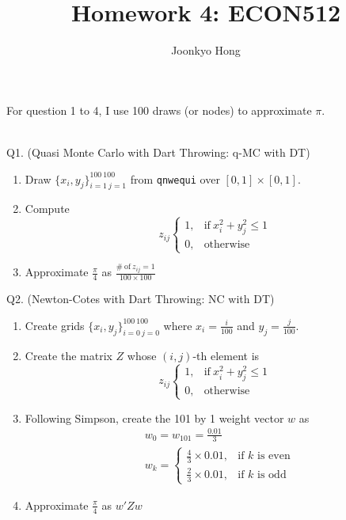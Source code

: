 \documentclass[10pt, letterpaper]{article}
\begin{document}
\title{Homework 4: ECON512}
\author{Joonkyo Hong}
\date{}
\maketitle
\smallskip

\noindent For question 1 to 4, I use 100 draws (or nodes) to approximate $\pi$.

~\\

\noindent Q1. (Quasi Monte Carlo with Dart Throwing: q-MC with DT)

\begin{enumerate}
\item Draw $\{ x_{i}, y_{j} \}_{i=1 ~ j=1}^{100 ~ 100}$ from \texttt{qnwequi}
 over $[0,1] \times [0,1]$.
\item Compute 
   \begin{equation}
    z_{ij}
    \begin{cases}
      1, & \text{if}\ x_{i}^{2} + y_{j}^{2} \leq 1 \nonumber \\
      0, & \text{otherwise}
    \end{cases}
  \end{equation} 
\item Approximate $\frac{\pi}{4}$ as $\frac{\#~\text{of}~z_{ij}=1}{100 \times 100}$
\end{enumerate}


\noindent Q2. (Newton-Cotes with Dart Throwing: NC with DT)

\begin{enumerate}
\item Create grids $\{ x_{i}, y_{j} \}_{i=0 ~ j=0}^{100 ~ 100}$ where $x_{i} = \frac{i}{100}$ and $y_{j} = \frac{j}{100}$.
\item Create the matrix $Z$ whose $(i,j)$-th element is 
   \begin{equation}
    z_{ij}
    \begin{cases}
      1, & \text{if}\ x_{i}^{2} + y_{j}^{2} \leq 1 \nonumber \\
      0, & \text{otherwise}
    \end{cases}
  \end{equation} 
\item Following Simpson, create the 101 by 1 weight vector $w$ as
   \begin{align}
    &  w_{0}=w_{101} = \frac{0.01}{3} \nonumber \\    
    &  w_{k} = 
    \begin{cases}
      \frac{4}{3} \times 0.01, & \text{if $k$ is even} \nonumber \\
      \frac{2}{3} \times 0.01, & \text{if $k$ is odd}
    \end{cases}
  \end{align} 
\item Approximate $\frac{\pi}{4}$ as $w'Zw$
\end{enumerate}
\end{document}
